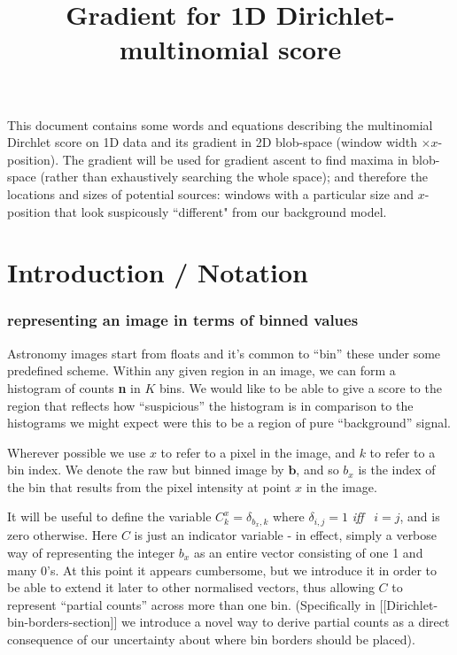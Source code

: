 \documentclass{report}
\title{Gradient for 1D Dirichlet-multinomial score}
\begin{document}
\maketitle

This document contains some words and equations describing the multinomial Dirchlet score on 1D data and its gradient in 2D blob-space (window width $\times x$-position). The gradient will be used for gradient ascent to find maxima in blob-space (rather than exhaustively searching the whole space); and therefore the locations and sizes of potential sources: windows with a particular size and $x$-position that look suspicously ``different" from our background model.

\section{Introduction / Notation}


\subsubsection{representing an image in terms of binned values}

Astronomy images start from floats and it's common to ``bin'' these
under some predefined scheme. Within any given region in an image, we
can form a histogram of counts \textbf{n} in $K$ bins. We would like
to be able to give a score to the region that reflects how
``suspicious'' the histogram is in comparison to the histograms we
might expect were this to be a region of pure ``background'' signal.

Wherever possible we use $x$ to refer to a pixel in the image, and $k$
to refer to a bin index.  We denote the raw but binned image by
$\mathbf{b}$, and so $b_x$ is the index of the bin that results from
the pixel intensity at point $x$ in the image.

It will be useful to define the variable $C^x_k =\delta_{b_x,k}$ where
$\delta_{i,j}=1$ {\it iff} \, $i=j$, and is zero otherwise. Here $C$
is just an indicator variable - in effect, simply a verbose way of
representing the integer $b_x$ as an entire vector consisting of one 1
and many 0's. At this point it appears cumbersome, but we introduce it
in order to be able to extend it later to other normalised vectors,
thus allowing $C$ to represent ``partial counts'' across more than one
bin.  (Specifically in [[Dirichlet-bin-borders-section]] we introduce
a novel way to derive partial counts as a direct consequence of our
uncertainty about where bin borders should be placed).
\end{document}
